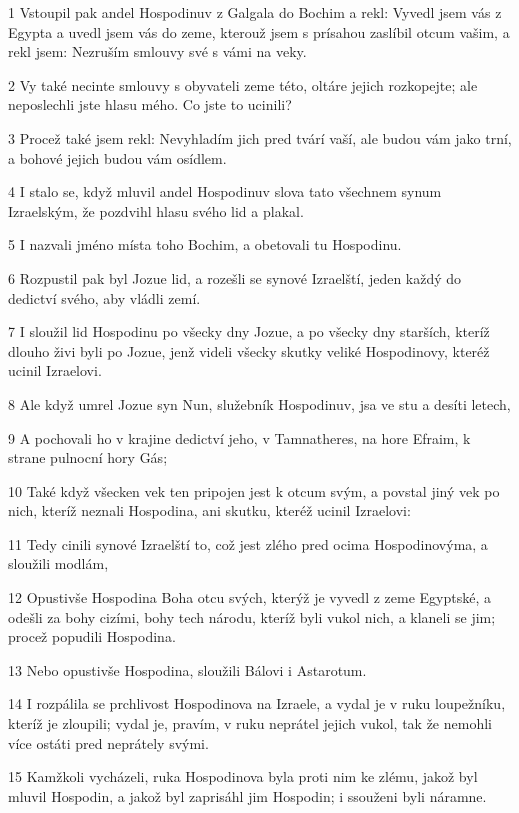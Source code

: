 \par 1 Vstoupil pak andel Hospodinuv z Galgala do Bochim a rekl: Vyvedl jsem vás z Egypta a uvedl jsem vás do zeme, kterouž jsem s prísahou zaslíbil otcum vašim, a rekl jsem: Nezruším smlouvy své s vámi na veky.
\par 2 Vy také necinte smlouvy s obyvateli zeme této, oltáre jejich rozkopejte; ale neposlechli jste hlasu mého. Co jste to ucinili?
\par 3 Procež také jsem rekl: Nevyhladím jich pred tvárí vaší, ale budou vám jako trní, a bohové jejich budou vám osídlem.
\par 4 I stalo se, když mluvil andel Hospodinuv slova tato všechnem synum Izraelským, že pozdvihl hlasu svého lid a plakal.
\par 5 I nazvali jméno místa toho Bochim, a obetovali tu Hospodinu.
\par 6 Rozpustil pak byl Jozue lid, a rozešli se synové Izraelští, jeden každý do dedictví svého, aby vládli zemí.
\par 7 I sloužil lid Hospodinu po všecky dny Jozue, a po všecky dny starších, kteríž dlouho živi byli po Jozue, jenž videli všecky skutky veliké Hospodinovy, kteréž ucinil Izraelovi.
\par 8 Ale když umrel Jozue syn Nun, služebník Hospodinuv, jsa ve stu a desíti letech,
\par 9 A pochovali ho v krajine dedictví jeho, v Tamnatheres, na hore Efraim, k strane pulnocní hory Gás;
\par 10 Také když všecken vek ten pripojen jest k otcum svým, a povstal jiný vek po nich, kteríž neznali Hospodina, ani skutku, kteréž ucinil Izraelovi:
\par 11 Tedy cinili synové Izraelští to, což jest zlého pred ocima Hospodinovýma, a sloužili modlám,
\par 12 Opustivše Hospodina Boha otcu svých, kterýž je vyvedl z zeme Egyptské, a odešli za bohy cizími, bohy tech národu, kteríž byli vukol nich, a klaneli se jim; procež popudili Hospodina.
\par 13 Nebo opustivše Hospodina, sloužili Bálovi i Astarotum.
\par 14 I rozpálila se prchlivost Hospodinova na Izraele, a vydal je v ruku loupežníku, kteríž je zloupili; vydal je, pravím, v ruku neprátel jejich vukol, tak že nemohli více ostáti pred neprátely svými.
\par 15 Kamžkoli vycházeli, ruka Hospodinova byla proti nim ke zlému, jakož byl mluvil Hospodin, a jakož byl zaprisáhl jim Hospodin; i ssouženi byli náramne.
